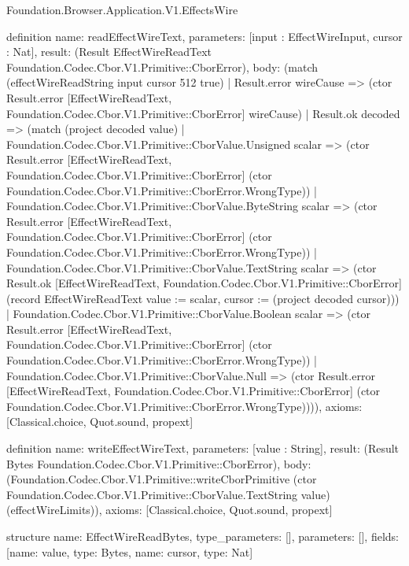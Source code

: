 \begin{lexlean}{Foundation.Browser.Application.V1.EffectsWire}
\begin{semanticmodule}
definition{
  name: readEffectWireText,
  parameters: [input : EffectWireInput, cursor : Nat],
  result: (Result EffectWireReadText Foundation.Codec.Cbor.V1.Primitive::CborError),
  body: (match (effectWireReadString input cursor 512 true)
    | Result.error wireCause => (ctor Result.error [EffectWireReadText, Foundation.Codec.Cbor.V1.Primitive::CborError] wireCause)
    | Result.ok decoded => (match (project decoded value)
      | Foundation.Codec.Cbor.V1.Primitive::CborValue.Unsigned scalar => (ctor Result.error [EffectWireReadText, Foundation.Codec.Cbor.V1.Primitive::CborError] (ctor Foundation.Codec.Cbor.V1.Primitive::CborError.WrongType))
      | Foundation.Codec.Cbor.V1.Primitive::CborValue.ByteString scalar => (ctor Result.error [EffectWireReadText, Foundation.Codec.Cbor.V1.Primitive::CborError] (ctor Foundation.Codec.Cbor.V1.Primitive::CborError.WrongType))
      | Foundation.Codec.Cbor.V1.Primitive::CborValue.TextString scalar => (ctor Result.ok [EffectWireReadText, Foundation.Codec.Cbor.V1.Primitive::CborError] (record EffectWireReadText {value := scalar, cursor := (project decoded cursor)}))
      | Foundation.Codec.Cbor.V1.Primitive::CborValue.Boolean scalar => (ctor Result.error [EffectWireReadText, Foundation.Codec.Cbor.V1.Primitive::CborError] (ctor Foundation.Codec.Cbor.V1.Primitive::CborError.WrongType))
      | Foundation.Codec.Cbor.V1.Primitive::CborValue.Null => (ctor Result.error [EffectWireReadText, Foundation.Codec.Cbor.V1.Primitive::CborError] (ctor Foundation.Codec.Cbor.V1.Primitive::CborError.WrongType)))),
  axioms: [Classical.choice, Quot.sound, propext]
}

definition{
  name: writeEffectWireText,
  parameters: [value : String],
  result: (Result Bytes Foundation.Codec.Cbor.V1.Primitive::CborError),
  body: (Foundation.Codec.Cbor.V1.Primitive::writeCborPrimitive (ctor Foundation.Codec.Cbor.V1.Primitive::CborValue.TextString value) (effectWireLimits)),
  axioms: [Classical.choice, Quot.sound, propext]
}

structure{
  name: EffectWireReadBytes,
  type_parameters: [],
  parameters: [],
  fields: [{name: value, type: Bytes}, {name: cursor, type: Nat}]
}


\end{semanticmodule}
\end{lexlean}
